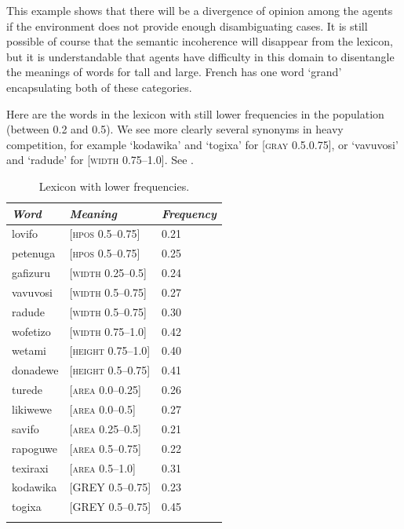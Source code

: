 This example shows that there will be a divergence of 
opinion among the agents if the environment does not 
provide enough 
disambiguating cases. It is still possible of course that 
the semantic incoherence will disappear from the lexicon, 
but it is understandable that agents have difficulty 
in this domain to disentangle the meanings of words for 
tall and large. French has one word `grand' encapsulating
both of these categories.

Here are the words in the lexicon with still lower 
frequencies in the population (between 0.2 and 0.5). We see
more clearly several synonyms in heavy competition, for example 
`kodawika' and `togixa' for [\textsc{gray} 0.5.0.75], or 
`vavuvosi' and `radude' for [\textsc{width} 0.75–1.0]. See . 


\begin{table}
\begin{center}
\begin{tabular}{ l  l  l }
\lsptoprule
{\itshape Word}&{\itshape Meaning} & {\itshape Frequency} \\ \midrule
lovifo & [\textsc{hpos} 0.5–0.75] & 0.21 \\ 
petenuga & [\textsc{hpos} 0.5–0.75] & 0.25 \\ 
gafizuru & [\textsc{width} 0.25–0.5] & 0.24 \\ 
vavuvosi & [\textsc{width} 0.5–0.75] & 0.27 \\ 
radude & [\textsc{width} 0.5–0.75] & 0.30 \\ 
wofetizo & [\textsc{width} 0.75–1.0] & 0.42 \\ 
wetami & [\textsc{height} 0.75–1.0] & 0.40 \\ 
donadewe & [\textsc{height} 0.5–0.75] & 0.41 \\ 
turede & [\textsc{area} 0.0–0.25] & 0.26 \\ 
likiwewe & [\textsc{area} 0.0–0.5] & 0.27 \\ 
savifo & [\textsc{area} 0.25–0.5] & 0.21 \\ 
rapoguwe & [\textsc{area} 0.5–0.75] & 0.22 \\ 
texiraxi & [\textsc{area} 0.5–1.0] & 0.31 \\ 
kodawika & [GREY 0.5–0.75] & 0.23 \\ 
togixa & [GREY 0.5–0.75] & 0.45 \\ 
\lspbottomrule
\end{tabular}
\caption{\label{tab:comp}Lexicon with lower frequencies.}
\end{center}
\end{table}

